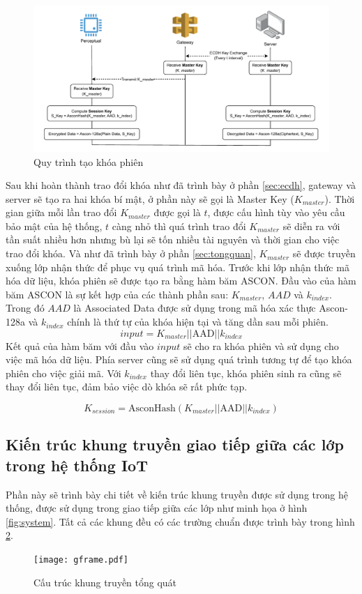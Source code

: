 \begin{figure}[h]
    \centering
    \includegraphics[width=1\linewidth]{skey.pdf}
    \caption{Quy trình tạo khóa phiên}
    \label{fig:skey}
\end{figure}

Sau khi hoàn thành trao đổi khóa như đã trình bày ở phần \ref{sec:ecdh}, gateway và server sẽ tạo ra hai khóa bí mật, ở phần này sẽ gọi là Master Key ($K_{master}$). Thời gian giữa mỗi lần trao đổi $K_{master}$ được gọi là $t$, được cấu hình tùy vào yêu cầu bảo mật của hệ thống, $t$ càng nhỏ thì quá trình trao đổi $K_{master}$ sẽ diễn ra với tần suất nhiều hơn nhưng bù lại sẽ tốn nhiều tài nguyên và thời gian cho việc trao đổi khóa. Và như đã trình bày ở phần \ref{sec:tongquan}, $K_{master}$ sẽ được truyền xuống lớp nhận thức để phục vụ quá trình mã hóa.  Trước khi lớp nhận thức mã hóa dữ liệu, khóa phiên sẽ được tạo ra bằng hàm băm ASCON. Đầu vào của hàm băm ASCON là sự kết hợp của các thành phần sau: $K_{master}$, $AAD$ và $k_{index}$. Trong đó $AAD$ là Associated Data được sử dụng trong mã hóa xác thực Ascon-128a và $k_{index}$ chính là thứ tự của khóa hiện tại và tăng dần sau mỗi phiên. 
\[
input = K_{master} || \text{AAD} ||k_{index}
\]
Kết quả của hàm băm với đầu vào $input$ sẽ cho ra khóa phiên và sử dụng cho việc mã hóa dữ liệu. Phía server cũng sẽ sử dụng quá trình tương tự để tạo khóa phiên cho việc giải mã. Với $k_{index}$ thay đổi liên tục, khóa phiên sinh ra cũng sẽ thay đổi liên tục, đảm bảo việc dò khóa sẽ rất phức tạp. 

\[
    K_{session} = \text{AsconHash}(K_{master} || \text{AAD} ||k_{index})
\]

\subsection{Kiến trúc khung truyền giao tiếp giữa các lớp trong hệ thống IoT}
\label{sec:frame}
Phần này sẽ trình bày chi tiết về kiến trúc khung truyền được sử dụng trong hệ thống, được sử dụng trong giao tiếp giữa các lớp như minh họa ở hình \ref{fig:system}. Tất cả các khung đều có các trường chuẩn được trình
bày trong hình \ref{fig:gframe}.
\begin{figure}[H]
    \centering
    \texttt{[image: gframe.pdf]}
    \caption{Cấu trúc khung truyền tổng quát}
    \label{fig:gframe}
\end{figure}

